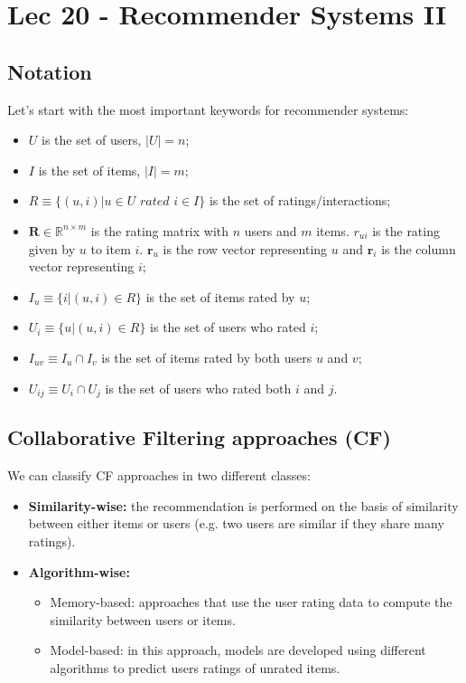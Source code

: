 \chapter{Lec 20 - Recommender Systems II}
\section{Notation}
Let's start with the most important keywords for recommender systems:
\begin{itemize}
    \item $U$ is the set of users, $|U| = n$;
    \item $I$ is the set of items, $|I| = m $;
    \item $R \equiv \{(u,i) | u \in U \,\, rated \,\, i\in I \}$ is the set of ratings/interactions;
    \item $\textbf{R} \in \mathbb{R}^{n \times m}$ is the rating matrix with $n$ users and $m$ items. $r_{ui}$ is the rating given by $u$ to item $i$. $\textbf{r}_{u}$ is the row vector representing $u$ and $\textbf{r}_{i}$ is the column vector representing $i$;
    \item $I_{u} \equiv \{i | (u,i) \in R\}$ is the set of items rated by $u$;
    \item $U_{i} \equiv \{u | (u,i) \in R\}$ is the set of users who rated $i$;
    \item $I_{uv} \equiv I_{u} \cap I_{v}$ is the set of items rated by both users $u$ and $v$;
    \item $U_{ij} \equiv U_{i} \cap U_{j}$ is the set of users who rated both $i$ and $j$.
\end{itemize}

\section{Collaborative Filtering approaches (CF)}
We can classify CF approaches in two different classes:
\begin{itemize}
    \item \textbf{Similarity-wise:} the recommendation is performed on the basis of similarity between either items or users (e.g. two users are similar if they share many ratings).
    \item \textbf{Algorithm-wise:}
    \begin{itemize}
        \item Memory-based: approaches that use the user rating data to compute the similarity between users or items.
        \item Model-based: in this approach, models are developed using different algorithms to predict users ratings of unrated items.
    \end{itemize}
\end{itemize}
